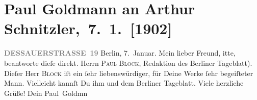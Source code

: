 

         
         \renewcommand{\erwaehntePersonen}{Personen: Paul Block, Paul Goldmann}
         \renewcommand{\erwaehnteInstitutionen}{Institutionen: Berliner Tageblatt}
         \renewcommand{\erwaehnteOrte}{Orte: Berlin, Dessauer Straße, Wien}
         \renewcommand{\erwaehnteWerke}{}
               \section[ Paul Goldmann an Arthur Schnitzler, 7. 1. {[}1902{]}]{ Paul Goldmann an Arthur Schnitzler, 7. 1. {[}1902{]}}\nopagebreak{}\rehead{ }\begin{ledgroupsized}[t]{13cm}\normalsize\beginnumbering \toendnotes[C]{\smallbreak\pagebreak[2]} 
\toendnotes[C]{\smallbreak}\pstart
           \noindent{}\raggedleft{}{\pb}\textcolor{gray}{\textbf{DESSAUERSTRASSE 19}}\pend
           \pstart
           Berlin, 7. Januar.\pend
           \pstart\center{}Mein lieber Freund,\pend\pstart
           itte, beantworte dieſe \label{K_L03191-1v}\label{K_L03191-1h}
               direkt. \damage{(}Herrn \textsc{Paul Block}, Redaktion des Berliner Tageblatt).  Dieſer Herr \textsc{Block} iſt ein ſehr liebenswürdiger, für Deine Werke ſehr begeiſteter Mann. Vielleicht
               kannſt Du ihm und dem Berliner Tageblatt\label{K_L03191-2v}\label{K_L03191-2h}. Viele herzliche Grüße! Dein \spacefill\mbox{Paul
                  Goldmn}\pend
           
         
         \endnumbering{}\end{ledgroupsized}  \newcommand{\dateiname}{L03191}\newcommand{\titel}{Paul Goldmann an Arthur Schnitzler, 7. 1. [1902]}\newcommand{\editorInnen}{Martin Anton Müller und Laura Untner}
      